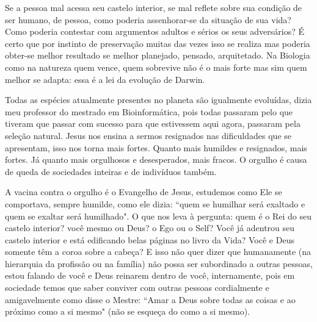\emdash{}Se a pessoa mal acessa seu castelo interior, se mal reflete sobre sua condição de ser humano, de pessoa, como poderia assenhorar-se da situação de sua vida? Como poderia contestar com argumentos adultos e sérios os seus adversários? É certo que por instinto de preservação muitas das vezes isso se realiza mas poderia obter-se melhor resultado se melhor planejado, pensado, arquitetado. Na Biologia como na natureza quem vence, quem sobrevive não é o mais forte mas sim quem melhor se adapta: essa é a lei da evolução de Darwin.

\emdash{}Todas as espécies atualmente presentes no planeta são igualmente evoluídas, dizia meu professor do mestrado em Bioinformática, pois todas passaram pelo que tiveram que passar com sucesso para que estivessem aqui agora, passaram pela seleção natural. Jesus nos ensina a sermos resignados nas dificuldades que se apresentam, isso nos torna mais fortes. Quanto mais humildes e resignados, mais fortes. Já quanto mais orgulhosos e desesperados, mais fracos. O orgulho é causa de queda de sociedades inteiras e de indivíduos também.

\emdash{}A vacina contra o orgulho é o Evangelho de Jesus, estudemos como Ele se comportava, sempre humilde, como ele dizia: ``quem se humilhar será exaltado e quem se exaltar será humilhado". O que nos leva à pergunta: quem é o Rei do seu castelo interior? você mesmo ou Deus? o Ego ou o Self? Você já adentrou seu castelo interior e está edificando belas páginas no livro da Vida? Você e Deus somente têm a coroa sobre a cabeça? E isso não quer dizer que humanamente (na hierarquia da profissão ou na família) não possa ser subordinado a outras pessoas, estou falando de você e Deus reinarem dentro de você, internamente, pois em sociedade temos que saber conviver com outras pessoas cordialmente e amigavelmente como disse o Mestre: ``Amar a Deus sobre todas as coisas e ao próximo como a si mesmo" (não se esqueça do como a si mesmo).